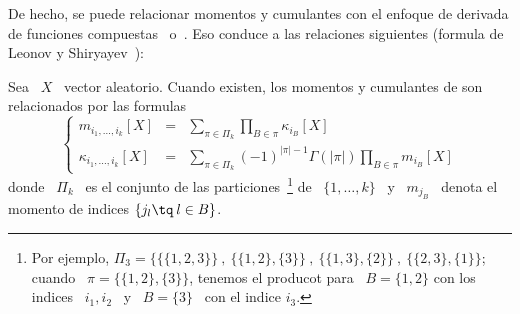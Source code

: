 {De hecho, se  puede relacionar momentos y cumulantes con  el enfoque de derivada
de funciones  compuestas~\cite[Teo.~5.1.4]{Sta99} o~\cite{Har06}. Eso  conduce a
las relaciones siguientes (formula  de Leonov y Shiryayev~\cite{LeoShi59, Shi84,
  LacAmb97, Bri01}):
%
\begin{lema}%
%
  Sea \  $X$ \ vector aleatorio.   Cuando existen, los momentos  y cumulantes de
  son relacionados por las formulas
  \[\left\{\begin{array}{lll}
  m_{i_1,\ldots,i_k}[X] & = & \displaystyle \sum_{\pi \in \Pi_k} \prod_{B \in
  \pi} \kappa_{i_B}[X] \\[5mm]
  \kappa_{i_1,\ldots,i_k}[X] & = & \displaystyle \sum_{\pi \in \Pi_k}
  (-1)^{|\pi|-1} \Gamma(|\pi|) \prod_{B \in \pi} m_{i_B}[X]
  \end{array}\right.\]
  donde \  $\Pi_k$ \  es el conjunto  de las  particiones~\footnote{Por ejemplo,
    $\Pi_3  = \Big\{  \big\{ \{1,2,3\}  \big\} \:  , \:  \big\{ \{1,2\}  , \{3\}
    \big\} \: , \: \big\{ \{1,3\} ,  \{2\} \big\} \: , \: \big\{ \{2,3\} , \{1\}
    \big\}$; cuando \ $\pi = \big\{ \{1,2\} , \{3\} \Big\}$, tenemos el producot
    para \ $B = \{1,2\}$ con los indices \  $i_1,i_2$ \ y \ $B = \{3\}$ \ con el
    indice $i_3$.}  de \ $\{  1 ,  \ldots , k  \}$ \ y  \ $m_{j_B}$ \  denota el
  momento de indices $\{ j_l \tq \: l \in B \}$.


\end{lema}}
